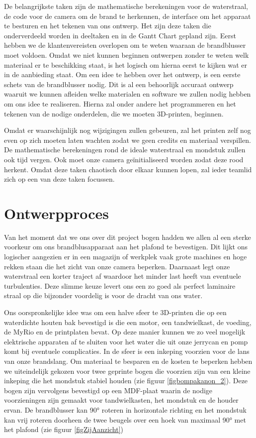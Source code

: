 \documentclass{kulakarticle}
\begin{document}
De belangrijkste taken zijn de mathematische berekeningen voor de waterstraal, de code voor de camera om de brand te herkennen, de interface om het apparaat te besturen en het tekenen van ons ontwerp. Het zijn deze taken die onderverdeeld worden in deeltaken en in de Gantt Chart gepland zijn. Eerst hebben we de klantenvereisten overlopen om te weten waaraan de brandblusser moet voldoen. Omdat we niet kunnen beginnen ontwerpen zonder te weten welk materiaal er te beschikking staat, is het logisch om hierna eerst te kijken wat er in de aanbieding staat. Om een idee te hebben over het ontwerp, is een eerste schets van de brandblusser nodig. Dit is al een behoorlijk accuraat ontwerp waaruit we kunnen afleiden welke materialen en software we zullen nodig hebben om ons idee te realiseren.  Hierna zal onder andere het programmeren en het tekenen van de nodige onderdelen, die we moeten 3D-printen, beginnen.

Omdat er waarschijnlijk nog wijzigingen zullen gebeuren, zal het printen zelf nog even op zich moeten laten wachten zodat we geen credits en materiaal verspillen. De mathematische berekeningen rond de ideale waterstraal en mondstuk zullen ook tijd vergen.  Ook moet onze camera geïnitialiseerd worden zodat deze rood herkent.  Omdat deze taken chaotisch door elkaar kunnen lopen,  zal ieder teamlid zich op een van deze taken focussen.  





\section{Ontwerpproces}
Van het moment dat we ons over dit project bogen hadden we allen al een sterke voorkeur om ons brandblusapparaat aan het plafond te bevestigen. Dit lijkt ons logischer aangezien er in een magazijn of werkplek vaak grote machines en hoge rekken staan die het zicht van onze camera beperken. Daarnaast legt onze waterstraal een korter traject af waardoor het minder last heeft van eventuele turbulenties. Deze slimme keuze levert ons een zo goed als perfect laminaire straal op die bijzonder voordelig is voor de dracht van ons water.

Ons oorspronkelijke idee was om een halve sfeer te 3D-printen die op een waterdichte houten bak bevestigd is die een motor, een tandwielkast, de voeding, de MyRio en de printplaten bevat. Op deze manier kunnen we zo veel mogelijk elektrische apparaten af te sluiten voor het water die uit onze jerrycan en pomp komt bij eventuele complicaties. In de sfeer is een inkeping voorzien voor de lans van onze brandslang. Om materiaal te besparen en de kosten te beperken hebben we uiteindelijk gekozen voor twee geprinte bogen die voorzien zijn van een kleine inkeping die het mondstuk stabiel houden (zie figuur \ref{figbompakanon_2}). Deze bogen zijn vervolgens bevestigd op een MDF-plaat waarin de nodige voorzieningen zijn gemaakt voor tandwielkasten, het mondstuk en de houder ervan. De brandblusser kan 90° roteren in horizontale richting en het mondstuk kan vrij roteren doorheen de twee beugels over een hoek van maximaal 90° met het plafond (zie figuur \ref{figZijAanzicht})
\end{document}
